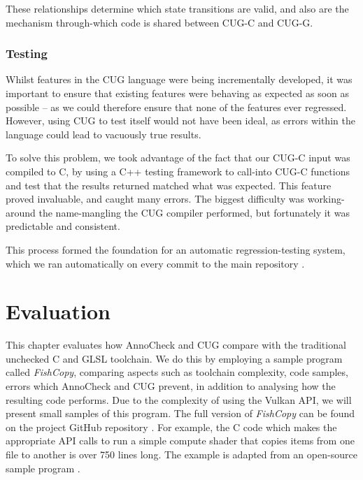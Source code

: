 \documentclass[a4paper,12pt,twoside,openright]{report}
\begin{document}
These relationships determine which state transitions are valid, and also are
the mechanism through-which code is shared between CUG-C and CUG-G.

\subsection{Testing}

\label{sec:testing}

Whilst features in the CUG language were being incrementally developed, it was
important to ensure that existing features were behaving as expected as soon as
possible -- as we could therefore ensure that none of the features ever
regressed. However, using CUG to test itself would not have been ideal, as
errors within the language could lead to vacuously true results.

To solve this problem, we took advantage of the fact that our CUG-C input was
compiled to C, by using a C++ testing framework to call-into CUG-C functions
and test that the results returned matched what was expected. This feature
proved invaluable, and caught many errors. The biggest difficulty was
working-around the name-mangling the CUG compiler performed, but fortunately it
was predictable and consistent.

This process formed the foundation for an automatic regression-testing system,
which we ran automatically on every commit to the main repository
\cite{ProjectSource} \cite{AutomatedTestCode} \cite{AutomatedTestOutput}.




\chapter{Evaluation}

\label{chp:evaluation}

This chapter evaluates how AnnoCheck and CUG compare with the traditional
unchecked C and GLSL toolchain. We do this by employing a sample program called
\textit{FishCopy}, comparing aspects such as toolchain complexity, code
samples, errors which AnnoCheck and CUG prevent, in addition to analysing how
the resulting code performs. Due to the complexity of using the Vulkan API, we
will present small samples of this program. The full version of
\textit{FishCopy} can be found on the project GitHub repository
\cite{ProjectSource}. For example, the C code which makes the appropriate API
calls to run a simple compute shader that copies items from one file to another
is over 750 lines long. The example is adapted from an open-source sample
program \cite{VulkanComputeExampleSource}.
\end{document}
